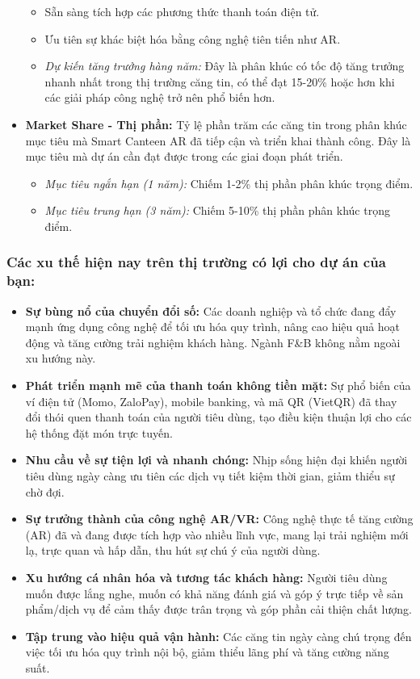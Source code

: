 \documentclass[12pt,a4paper]{article}
\begin{document}
\begin{itemize}[label=\textbullet]
\begin{itemize}[label=\textendash]
        \item Sẵn sàng tích hợp các phương thức thanh toán điện tử.
        \item Ưu tiên sự khác biệt hóa bằng công nghệ tiên tiến như AR.
        \item \textit{Dự kiến tăng trưởng hàng năm:} Đây là phân khúc có tốc độ tăng trưởng nhanh nhất trong thị trường căng tin, có thể đạt 15-20\% hoặc hơn khi các giải pháp công nghệ trở nên phổ biến hơn.
    \end{itemize}
    \item \textbf{Market Share - Thị phần:} Tỷ lệ phần trăm các căng tin trong phân khúc mục tiêu mà Smart Canteen AR đã tiếp cận và triển khai thành công. Đây là mục tiêu mà dự án cần đạt được trong các giai đoạn phát triển.
    \begin{itemize}[label=\textendash]
        \item \textit{Mục tiêu ngắn hạn (1 năm):} Chiếm 1-2\% thị phần phân khúc trọng điểm.
        \item \textit{Mục tiêu trung hạn (3 năm):} Chiếm 5-10\% thị phần phân khúc trọng điểm.
    \end{itemize}
\end{itemize}

\subsubsection{Các xu thế hiện nay trên thị trường có lợi cho dự án của bạn:}

\begin{itemize}[label=\textbullet]
    \item \textbf{Sự bùng nổ của chuyển đổi số:} Các doanh nghiệp và tổ chức đang đẩy mạnh ứng dụng công nghệ để tối ưu hóa quy trình, nâng cao hiệu quả hoạt động và tăng cường trải nghiệm khách hàng. Ngành F\&B không nằm ngoài xu hướng này.
    \item \textbf{Phát triển mạnh mẽ của thanh toán không tiền mặt:} Sự phổ biến của ví điện tử (Momo, ZaloPay), mobile banking, và mã QR (VietQR) đã thay đổi thói quen thanh toán của người tiêu dùng, tạo điều kiện thuận lợi cho các hệ thống đặt món trực tuyến.
    \item \textbf{Nhu cầu về sự tiện lợi và nhanh chóng:} Nhịp sống hiện đại khiến người tiêu dùng ngày càng ưu tiên các dịch vụ tiết kiệm thời gian, giảm thiểu sự chờ đợi.
    \item \textbf{Sự trưởng thành của công nghệ AR/VR:} Công nghệ thực tế tăng cường (AR) đã và đang được tích hợp vào nhiều lĩnh vực, mang lại trải nghiệm mới lạ, trực quan và hấp dẫn, thu hút sự chú ý của người dùng.
    \item \textbf{Xu hướng cá nhân hóa và tương tác khách hàng:} Người tiêu dùng muốn được lắng nghe, muốn có khả năng đánh giá và góp ý trực tiếp về sản phẩm/dịch vụ để cảm thấy được trân trọng và góp phần cải thiện chất lượng.
    \item \textbf{Tập trung vào hiệu quả vận hành:} Các căng tin ngày càng chú trọng đến việc tối ưu hóa quy trình nội bộ, giảm thiểu lãng phí và tăng cường năng suất.
\end{itemize}
\end{document}
